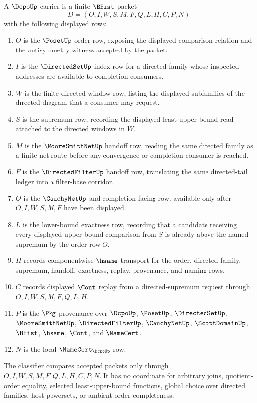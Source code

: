 \begin{definition}
\label{def:dcpo-carrier}
A $\DcpoUp$ carrier is a finite $\BHist$ packet
$$
D=(O,I,W,S,M,F,Q,L,H,C,P,N)
$$
with the following displayed rows:
\begin{enumerate}
\item $O$ is the $\PosetUp$ order row, exposing the displayed comparison relation and the antisymmetry witness accepted by the packet.
\item $I$ is the $\DirectedSetUp$ index row for a directed family whose inspected addresses are available to completion consumers.
\item $W$ is the finite directed-window row, listing the displayed subfamilies of the directed diagram that a consumer may request.
\item $S$ is the supremum row, recording the displayed least-upper-bound read attached to the directed windows in $W$.
\item $M$ is the $\MooreSmithNetUp$ handoff row, reading the same directed family as a finite net route before any convergence or completion consumer is reached.
\item $F$ is the $\DirectedFilterUp$ handoff row, translating the same directed-tail ledger into a filter-base corridor.
\item $Q$ is the $\CauchyNetUp$ and completion-facing row, available only after $O,I,W,S,M,F$ have been displayed.
\item $L$ is the lower-bound exactness row, recording that a candidate receiving every displayed upper-bound comparison from $S$ is already above the named supremum by the order row $O$.
\item $H$ records componentwise $\hsame$ transport for the order, directed-family, supremum, handoff, exactness, replay, provenance, and naming rows.
\item $C$ records displayed $\Cont$ replay from a directed-supremum request through $O,I,W,S,M,F,Q,L,H$.
\item $P$ is the $\Pkg$ provenance over $\DcpoUp$, $\PosetUp$, $\DirectedSetUp$, $\MooreSmithNetUp$, $\DirectedFilterUp$, $\CauchyNetUp$, $\ScottDomainUp$, $\BHist$, $\hsame$, $\Cont$, and $\NameCert$.
\item $N$ is the local $\NameCert_{\DcpoUp}$ row.
\end{enumerate}
The classifier compares accepted packets only through $O,I,W,S,M,F,Q,L,H,C,P,N$. It has no coordinate for arbitrary joins, quotient-order equality, selected least-upper-bound functions, global choice over directed families, host powersets, or ambient order completeness.
\end{definition}

